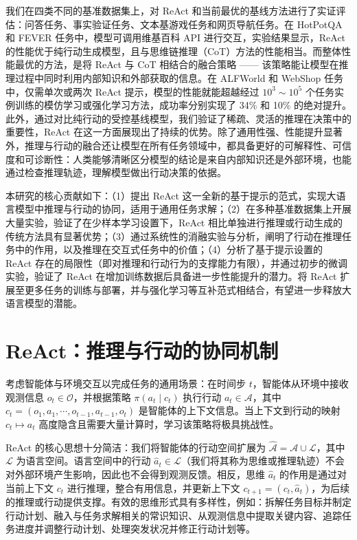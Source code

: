 我们在四类不同的基准数据集上，对 ReAct 和当前最优的基线方法进行了实证评估：问答任务、事实验证任务、文本基游戏任务和网页导航任务。在 HotPotQA 和 FEVER 任务中，模型可调用维基百科 API 进行交互，实验结果显示，ReAct 的性能优于纯行动生成模型，且与思维链推理（CoT）方法的性能相当。而整体性能最优的方法，是将 ReAct 与 CoT 相结合的融合策略 —— 该策略能让模型在推理过程中同时利用内部知识和外部获取的信息。在 ALFWorld 和 WebShop 任务中，仅需单次或两次 ReAct 提示，模型的性能就能超越经过 $10^3{\sim}10^5$ 个任务实例训练的模仿学习或强化学习方法，成功率分别实现了 34\% 和 10\% 的绝对提升。此外，通过对比纯行动的受控基线模型，我们验证了稀疏、灵活的推理在决策中的重要性，ReAct 在这一方面展现出了持续的优势。除了通用性强、性能提升显著外，推理与行动的融合还让模型在所有任务领域中，都具备更好的可解释性、可信度和可诊断性：人类能够清晰区分模型的结论是来自内部知识还是外部环境，也能通过检查推理轨迹，理解模型做出行动决策的依据。

本研究的核心贡献如下：（1）提出 ReAct 这一全新的基于提示的范式，实现大语言模型中推理与行动的协同，适用于通用任务求解；（2）在多种基准数据集上开展大量实验，验证了在少样本学习设置下，ReAct 相比单独进行推理或行动生成的传统方法具有显著优势；（3）通过系统性的消融实验与分析，阐明了行动在推理任务中的作用，以及推理在交互式任务中的价值；（4）分析了基于提示设置的 ReAct 存在的局限性（即对推理和行动行为的支撑能力有限），并通过初步的微调实验，验证了 ReAct 在增加训练数据后具备进一步性能提升的潜力。将 ReAct 扩展至更多任务的训练与部署，并与强化学习等互补范式相结合，有望进一步释放大语言模型的潜能。

\section{ReAct：推理与行动的协同机制}

考虑智能体与环境交互以完成任务的通用场景：在时间步 $t$，智能体从环境中接收观测信息 $o_t \in \mathcal{O}$，并根据策略 $\pi(a_t \mid c_t)$ 执行行动 $a_t \in \mathcal{A}$，其中 $c_t = (o_1, a_1, \cdots, o_{t-1}, a_{t-1}, o_t)$ 是智能体的上下文信息。当上下文到行动的映射 $c_t \mapsto a_t$ 高度隐含且需要大量计算时，学习该策略将极具挑战性。

ReAct 的核心思想十分简洁：我们将智能体的行动空间扩展为 $\hat{\mathcal{A}} = \mathcal{A} \cup \mathcal{L}$，其中 $\mathcal{L}$ 为语言空间。语言空间中的行动 $\hat{a}_t \in \mathcal{L}$（我们将其称为思维或推理轨迹）不会对外部环境产生影响，因此也不会得到观测反馈。相反，思维 $\hat{a}_t$ 的作用是通过对当前上下文 $c_t$ 进行推理，整合有用信息，并更新上下文 $c_{t+1} = (c_t, \hat{a}_t)$，为后续的推理或行动提供支撑。有效的思维形式具有多样性，例如：拆解任务目标并制定行动计划、融入与任务求解相关的常识知识、从观测信息中提取关键内容、追踪任务进度并调整行动计划、处理突发状况并修正行动计划等。

